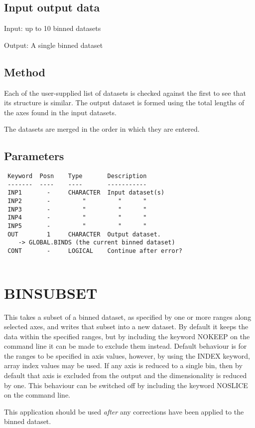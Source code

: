 \documentclass{book}
\renewcommand{\_}{{\tt\char'137}}     %
\begin{document}
\subsection{Input output data}
Input: up to 10 binned datasets
 
Output: A single binned dataset
 
\subsection{Method}
Each of the user-supplied list of datasets is checked against the
first to see that its structure is similar. The output dataset is
formed using the total lengths of the axes found in the input
datasets.
 
The datasets are merged in the order in which they are entered.
 
\subsection{Parameters}
\begin{verbatim}
 Keyword  Posn    Type       Description
 -------  ----    ----       -----------
 INP1       -     CHARACTER  Input dataset(s)
 INP2       -         "         "      "
 INP3       -         "         "      "
 INP4       -         "         "      "
 INP5       -         "         "      "
 OUT        1     CHARACTER  Output dataset.
    -> GLOBAL.BINDS (the current binned dataset)
 CONT       -     LOGICAL    Continue after error?
 
\end{verbatim}\section{BINSUBSET}
This takes a subset of a binned dataset, as specified by one or
more ranges along selected axes, and writes that subset into
a new dataset. By default it keeps the data within the specified
ranges, but by including the keyword NOKEEP on the command line
it can be made to exclude them instead. Default behaviour is for
the ranges to be specified in axis values, however, by using the
INDEX keyword, array index values may be used. If any axis is reduced
to a single bin, then by default that axis is excluded from the
output and the dimensionality is reduced by one. This behaviour
can be switched off by including the keyword NOSLICE on the
command line.
 
This application should be used {\em after} any corrections have been
applied to the binned dataset.
 
\end{document}
